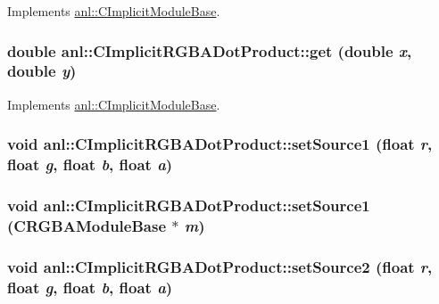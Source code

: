 Implements \hyperlink{classanl_1_1CImplicitModuleBase_ac17d592612c82ba3d47f9229a00b1fe3}{anl::CImplicitModuleBase}.\hypertarget{classanl_1_1CImplicitRGBADotProduct_ad2d4c06f27551fee761b9736689c971a}{
\subsubsection[{get}]{\setlength{\rightskip}{0pt plus 5cm}double anl::CImplicitRGBADotProduct::get (double {\em x}, \/  double {\em y})}}
\label{classanl_1_1CImplicitRGBADotProduct_ad2d4c06f27551fee761b9736689c971a}


Implements \hyperlink{classanl_1_1CImplicitModuleBase_ab88f8a1822dcfbc13ba5230318b0acd1}{anl::CImplicitModuleBase}.\hypertarget{classanl_1_1CImplicitRGBADotProduct_a003542de9b9e5cb662cf89ab301f4da9}{
\subsubsection[{setSource1}]{\setlength{\rightskip}{0pt plus 5cm}void anl::CImplicitRGBADotProduct::setSource1 (float {\em r}, \/  float {\em g}, \/  float {\em b}, \/  float {\em a})}}
\label{classanl_1_1CImplicitRGBADotProduct_a003542de9b9e5cb662cf89ab301f4da9}
\hypertarget{classanl_1_1CImplicitRGBADotProduct_a37a08bf3db051f9a1ff4ca8d1dbc9d01}{
\subsubsection[{setSource1}]{\setlength{\rightskip}{0pt plus 5cm}void anl::CImplicitRGBADotProduct::setSource1 ({\bf CRGBAModuleBase} $\ast$ {\em m})}}
\label{classanl_1_1CImplicitRGBADotProduct_a37a08bf3db051f9a1ff4ca8d1dbc9d01}
\hypertarget{classanl_1_1CImplicitRGBADotProduct_ac216b0c7ee189e09445c598e618f1857}{
\subsubsection[{setSource2}]{\setlength{\rightskip}{0pt plus 5cm}void anl::CImplicitRGBADotProduct::setSource2 (float {\em r}, \/  float {\em g}, \/  float {\em b}, \/  float {\em a})}}
